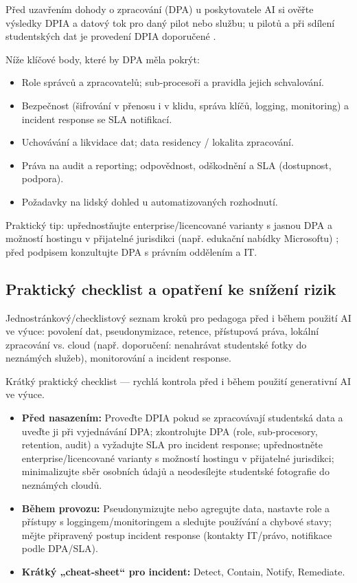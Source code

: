 \documentclass{report}%
\begin{document}
%
\noindent Před uzavřením dohody o zpracování (DPA) u poskytovatele AI si ověřte výsledky DPIA a datový tok pro daný pilot nebo službu; u pilotů a při sdílení studentských dat je provedení DPIA doporučené \cite{kb_ai_101_tipu_pdf_04e4a115_page_8_1}.

Níže klíčové body, které by DPA měla pokrýt:

\begin{itemize}
  \item Role správců a zpracovatelů; sub‑procesoři a pravidla jejich schvalování.
  \item Bezpečnost (šifrování v přenosu i v klidu, správa klíčů, logging, monitoring) a incident response se SLA notifikací.
  \item Uchovávání a likvidace dat; data residency / lokalita zpracování.
  \item Práva na audit a reporting; odpovědnost, odškodnění a SLA (dostupnost, podpora).
  \item Požadavky na lidský dohled u automatizovaných rozhodnutí.
\end{itemize}

Praktický tip: upřednostňujte enterprise/licencované varianty s jasnou DPA a možností hostingu v přijatelné jurisdikci (např. edukační nabídky Microsoftu) \cite{kb_ai_101_tipu_pdf_04e4a115_page_3_1}; před podpisem konzultujte DPA s právním oddělením a IT.%

%
\subsection{Praktický checklist a opatření ke snížení rizik}%
Jednostránkový/checklistový seznam kroků pro pedagoga před i během použití AI ve výuce: povolení dat, pseudonymizace, retence, přístupová práva, lokální zpracování vs. cloud (např. doporučení: nenahrávat studentské fotky do neznámých služeb), monitorování a incident response.%


%
Krátký praktický checklist — rychlá kontrola před i během použití generativní AI ve výuce.

\begin{itemize}
\item \textbf{Před nasazením:} Proveďte DPIA pokud se zpracovávají studentská data a uveďte ji při vyjednávání DPA;\cite{kb_ai_101_tipu_pdf_04e4a115_page_8_1} zkontrolujte DPA (role, sub‑procesory, retention, audit) a vyžadujte SLA pro incident response;\cite{kb_ai_101_tipu_pdf_04e4a115_page_8_1} upřednostněte enterprise/licencované varianty s možností hostingu v přijatelné jurisdikci;\cite{kb_ai_101_tipu_pdf_04e4a115_page_3_1} minimalizujte sběr osobních údajů a neodesílejte studentské fotografie do neznámých cloudů.\cite{kb_ai_101_tipu_pdf_04e4a115_page_53_2}
\item \textbf{Během provozu:} Pseudonymizujte nebo agregujte data, nastavte role a přístupy s loggingem/monitoringem a sledujte používání a chybové stavy;\cite{kb_ai_101_tipu_pdf_04e4a115_page_8_1} mějte připravený postup incident response (kontakty IT/právo, notifikace podle DPA/SLA).\cite{kb_ai_101_tipu_pdf_04e4a115_page_8_1}
\item \textbf{Krátký „cheat‑sheet“ pro incident:} Detect, Contain, Notify, Remediate.
\end{itemize}%
\end{document}

